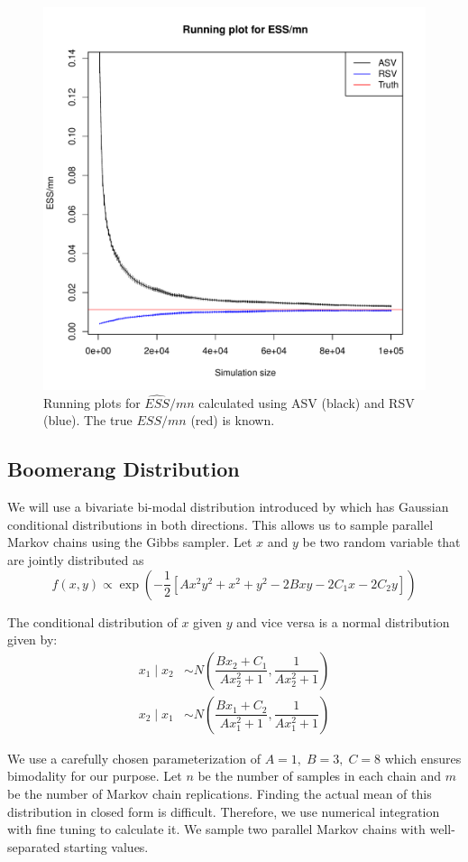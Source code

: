 \documentclass[12pt]{article}
\theoremstyle{remark}
\begin{document}
\begin{figure}[h]
    \centering
    \includegraphics[width = .5\textwidth]{plots/var-ess.pdf}
    \caption{Running plots for $\hat{ESS}/mn$ calculated using ASV (black) and RSV (blue). The true $ESS/mn$ (red) is known.}
    \label{fig:var-ess}
\end{figure}


\subsection{Boomerang Distribution} \label{ex:boomerang}

We will use a bivariate bi-modal distribution introduced by \cite{gelman1991note} which has Gaussian conditional distributions in both directions. This allows us to sample parallel Markov chains using the Gibbs sampler. Let $x$ and $y$ be two random variable that are jointly distributed as 
%
\[
f(x, y) \propto \exp\left(-\dfrac{1}{2}[Ax^2y^2 + x^2 + y^2 -2Bxy  -2C_1x - 2C_2y]\right)
\]

The conditional distribution of $x$ given $y$ and vice versa is a normal distribution given by:
%
\begin{align*}
    x_1 \mid x_2 &\sim N\left(\dfrac{Bx_2 + C_1}{Ax_2^2 + 1}, \dfrac{1}{Ax_2^2 + 1}\right)\\
    x_2 \mid x_1 &\sim N\left(\dfrac{Bx_1 + C_2}{Ax_1^2 + 1}, \dfrac{1}{Ax_1^2 + 1}\right)
\end{align*}

We use a carefully chosen parameterization of $A = 1,\; B = 3,\; C = 8$ which ensures bimodality for our purpose.  Let $n$ be the number of samples in each chain and $m$ be the number of Markov chain replications. Finding the actual mean of this distribution in closed form is difficult. Therefore, we use numerical integration with fine tuning to calculate it. We sample two parallel Markov chains with well-separated starting values. 
\end{document}
